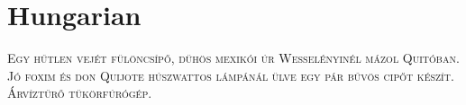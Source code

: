 

\presection\section*{\checkno Hungarian}\postsection

\textsc{
Egy hűtlen vejét fülöncsípő, dühös mexikói úr Wesselényinél mázol Quitóban.
Jó foxim és don Quijote húszwattos lámpánál ülve egy pár bűvös cipőt készít.
Árvíztűrő tükörfúrógép.}